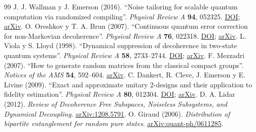\documentclass[11pt,a4paper]{article}
\begin{document}
\begin{thebibliography}{99}
 J. J. Wallman y J. Emerson (2016). ``Noise tailoring for scalable quantum computation via randomized compiling''. \emph{Physical Review A} \textbf{94}, 052325. \href{https://doi.org/10.1103/PhysRevA.94.052325}{DOI}; \href{https://arxiv.org/abs/1512.01098}{arXiv}.
 O. Oreshkov y T. A. Brun (2007). ``Continuous quantum error correction for non-Markovian decoherence''. \emph{Physical Review A} \textbf{76}, 022318. \href{https://doi.org/10.1103/PhysRevA.76.022318}{DOI}; \href{https://arxiv.org/abs/0705.2342}{arXiv}.
 L. Viola y S. Lloyd (1998). ``Dynamical suppression of decoherence in two-state quantum systems''. \emph{Physical Review A} \textbf{58}, 2733--2744. \href{https://doi.org/10.1103/PhysRevA.58.2733}{DOI}; \href{https://arxiv.org/abs/quant-ph/9803057}{arXiv}.
 F. Mezzadri (2007). ``How to generate random matrices from the classical compact groups''. \emph{Notices of the AMS} \textbf{54}, 592--604. \href{https://arxiv.org/abs/math-ph/0609050}{arXiv}.
 C. Dankert, R. Cleve, J. Emerson y E. Livine (2009). ``Exact and approximate unitary 2-designs and their application to fidelity estimation''. \emph{Physical Review A} \textbf{80}, 012304. \href{https://doi.org/10.1103/PhysRevA.80.012304}{DOI}; \href{https://arxiv.org/abs/quant-ph/0606161}{arXiv}.
 D. A. Lidar (2012). \emph{Review of Decoherence Free Subspaces, Noiseless Subsystems, and Dynamical Decoupling}. \href{https://arxiv.org/abs/1208.5791}{arXiv:1208.5791}.
 O. Giraud (2006). \emph{Distribution of bipartite entanglement for random pure states}. \href{https://arxiv.org/abs/quant-ph/0611285}{arXiv:quant-ph/0611285}.
\end{thebibliography}
\endgroup
\end{document}
